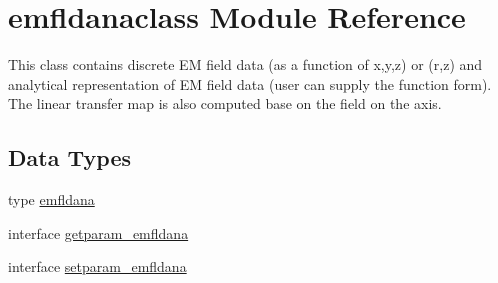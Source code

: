 \hypertarget{namespaceemfldanaclass}{}\section{emfldanaclass Module Reference}
\label{namespaceemfldanaclass}


This class contains discrete EM field data (as a function of x,y,z) or (r,z) and analytical representation of EM field data (user can supply the function form). The linear transfer map is also computed base on the field on the axis.  


\subsection*{Data Types}
\begin{DoxyCompactItemize}
\item 
type \mbox{\hyperlink{namespaceemfldanaclass_structemfldanaclass_1_1emfldana}{emfldana}}
\item 
interface \mbox{\hyperlink{interfaceemfldanaclass_1_1getparam__emfldana}{getparam\+\_\+emfldana}}
\item 
interface \mbox{\hyperlink{interfaceemfldanaclass_1_1setparam__emfldana}{setparam\+\_\+emfldana}}
\end{DoxyCompactItemize}

